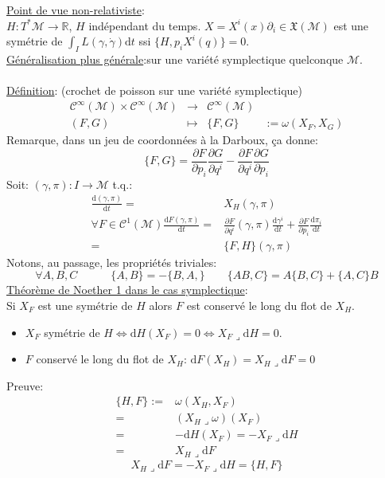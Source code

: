 \documentclass[a4paper,11pt]{article}
\renewcommand{\d}{{\mathrm{d}}}
\newcommand{\dr}[2]{\frac{\partial {#1}}{\partial{#2}}}
\begin{document}
\noindent \underline{Point de vue non-relativiste}:\\
$H:T^*\mathcal{M}\to \mathbb{R}$, $H$ indépendant du temps. $X=X^i(x)\partial_i \in \mathfrak{X}(\mathcal{M})$ est une symétrie de $\int_I L(\gamma,\dot\gamma)\d t$ ssi $\{H, p_i X^i(q)\}=0$.\\
\underline{Généralisation plus générale}:sur une variété symplectique quelconque $\mathcal{M}$.\\
\\
\underline{Définition}: (crochet de poisson sur une variété symplectique)\\
$$\begin{matrix}
\mathcal{C}^\infty(\mathcal{M})\times\mathcal{C}^\infty(\mathcal{M}) &
\to & \mathcal{C}^\infty(\mathcal{M})&\\
(F,G) & \mapsto & \{F,G\}&
:= \omega(X_F,X_G)
\end{matrix}$$
Remarque, dans un jeu de coordonnées à la Darboux, ça donne:
$$\{F,G\} = \dr F{p_i}\dr G{q^i} - \dr F{q^i}\dr G{p_i}$$
Soit: $(\gamma,\pi): I \to \mathcal{M}$ t.q.:
\begin{align*}
\frac{\d (\gamma,\pi)}{\d t} =& X_H(\gamma,\pi)\\
\forall F \in\mathcal{C}^1(\mathcal{M}) \frac{\d F(\gamma,\pi)}{\d t} =&
\dr F{q^i}(\gamma,\pi)\frac{\d \gamma^i}{\d t} + \dr F{p_i}\frac{\d \pi_i}{\d t}\\
=& \{F,H\}(\gamma,\pi)
\end{align*}
Notons, au passage, les propriétés triviales:
$$\forall A,B,C \quad \quad \quad \{A,B\}=-\{B,A,\} \quad \quad \{AB,C\}=A\{B,C\}+\{A,C\}B$$
\underline{Théorème de Noether 1 dans le cas symplectique}:\\
Si $X_F$ est une symétrie de $H$ alors $F$ est conservé le long du flot de $X_H$.
\begin{itemize}
\item $X_F$ symétrie de $H \iff \d H(X_F)=0 \iff X_F\lrcorner\d H = 0$.
\item $F$ conservé le long du flot de $X_H$: $\d F(X_H) = X_H\lrcorner\d F = 0$
\end{itemize}
Preuve:
\begin{align*}
\{H,F\} :=& \omega(X_H, X_F)\\
=& (X_H\lrcorner \omega)(X_F)\\
=& -\d H(X_F) = - X_F \lrcorner \d H\\
=& X_H \lrcorner \d F
\end{align*}
$$\boxed{X_H\lrcorner \d F = - X_F \lrcorner\d H =\{H,F\}}$$
\end{document}
